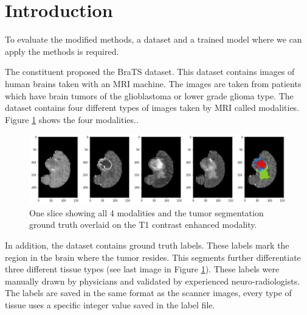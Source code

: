 \section{Introduction}
To evaluate the modified methods, a dataset and a trained model where we can apply the methods is required.

The constituent proposed the BraTS \cite{menze2015multimodal} dataset. This dataset contains
images of human brains taken with an MRI machine. The images are taken from patients which have brain tumors of the glioblastoma or lower grade glioma type. The dataset contains four different types of images taken by MRI called modalities. Figure \ref{brats_example} shows the four modalities..

\begin{figure}[H]
\centering
\includegraphics[width=14cm]{chapters/04_segmentation/images/brats.png}
\caption{One slice showing all 4 modalities and the tumor segmentation ground truth overlaid on the T1 contrast enhanced modality.}
\label{brats_example}
\end{figure}

In addition, the dataset contains ground truth labels. These labels mark the region in the brain where the tumor resides.
This segments further differentiate three different tissue types (see last image in Figure \ref{brats_example}).
These labels were manually drawn by physicians and validated by experienced neuro-radiologists.
The labels are saved in the same format as the scanner images, every type of tissue uses a specific integer value saved in the label file.
